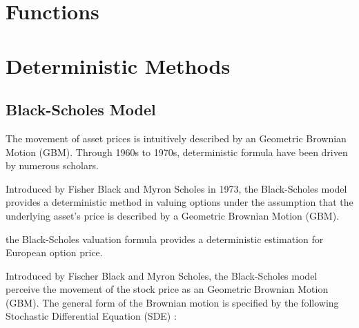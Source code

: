 \begin{table}[h]

\end{table}

\section{Functions}

\section{Deterministic Methods}

\subsection{Black-Scholes Model}
The movement of asset prices is intuitively described by an Geometric Brownian Motion (GBM). Through 1960s to 1970s, deterministic formula have been driven by numerous scholars.

Introduced by Fisher Black and Myron Scholes in 1973, the Black-Scholes model provides a deterministic method in valuing options under the assumption that the underlying asset's price is described by a Geometric Brownian Motion (GBM).


the Black-Scholes valuation formula provides a deterministic estimation for European option price.


Introduced by Fischer Black and Myron Scholes, the Black-Scholes model perceive the movement of the stock price as an Geometric Brownian Motion (GBM). The general form of the Brownian motion is specified by the following Stochastic Differential Equation (SDE) \cite{Glasserman2003}:

